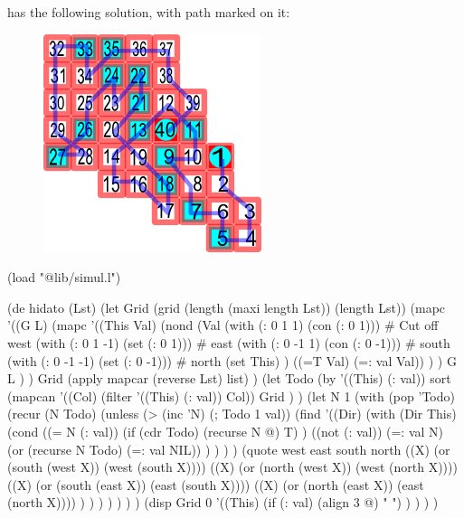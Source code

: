 has the following solution, with path marked on it:

\begin{figure}[H]
  \centering
\includegraphics[scale=.9]{graphics/HEnd.png}  
\end{figure}


\begin{wideverbatim}
(load "@lib/simul.l")
 
(de hidato (Lst)
   (let Grid (grid (length (maxi length Lst)) (length Lst))
      (mapc
         '((G L)
            (mapc
               '((This Val)
                  (nond
                     (Val
                        (with (: 0 1 1) (con (: 0 1)))    # Cut off west
                        (with (: 0 1 -1) (set (: 0 1)))   # east
                        (with (: 0 -1 1) (con (: 0 -1)))  # south
                        (with (: 0 -1 -1) (set (: 0 -1))) # north
                        (set This) )
                     ((=T Val) (=: val Val)) ) )
               G L ) )
         Grid
         (apply mapcar (reverse Lst) list) )
      (let Todo
         (by '((This) (: val)) sort
            (mapcan '((Col) (filter '((This) (: val)) Col))
               Grid ) )
         (let N 1
            (with (pop 'Todo)
               (recur (N Todo)
                  (unless (> (inc 'N) (; Todo 1 val))
                     (find
                        '((Dir)
                           (with (Dir This)
                              (cond
                                 ((= N (: val))
                                    (if (cdr Todo) (recurse N @) T) )
                                 ((not (: val))
                                    (=: val N)
                                    (or (recurse N Todo) (=: val NIL)) ) ) ) )
                        (quote
                           west east south north
                           ((X) (or (south (west X)) (west (south X))))
                           ((X) (or (north (west X)) (west (north X))))
                           ((X) (or (south (east X)) (east (south X))))
                           ((X) (or (north (east X)) (east (north X)))) ) ) ) ) ) ) )
      (disp Grid 0
         '((This)
            (if (: val) (align 3 @) "   ") ) ) ) )


\end{wideverbatim}

